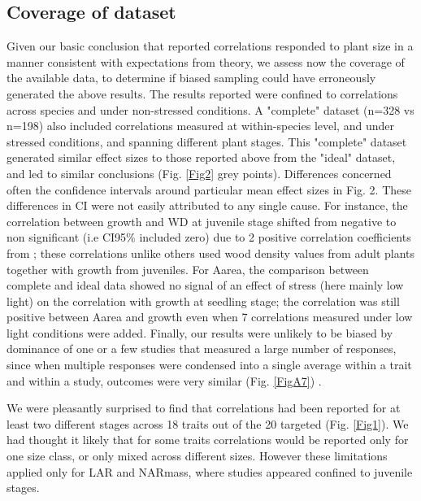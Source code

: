 \documentclass[a4paper]{article}\usepackage[]{graphicx}\usepackage[]{color}
\begin{document}
\subsection*{Coverage of dataset}

Given our basic conclusion that reported correlations responded to plant size in a manner consistent with expectations from theory, we assess now the coverage of the available data, to determine if biased sampling could have erroneously generated the above results. The results reported were confined to correlations across species and under non-stressed conditions. A "complete" dataset (n=328 vs n=198) also included correlations measured at within-species level, and under stressed conditions, and spanning different plant stages. This "complete" dataset generated similar effect sizes to those reported above from the "ideal" dataset, and led to similar conclusions (Fig. \ref{Fig2} grey points). Differences concerned often the confidence intervals around particular mean effect sizes in Fig. 2. These differences in CI were not easily attributed to any single cause. For instance, the correlation between growth and WD at juvenile stage shifted from negative to non significant (i.e CI95\% included zero) due to 2 positive correlation coefficients from \citet{Augspurger:1984ct};  these correlations unlike others used wood density values from adult plants together with growth from juveniles. For Aarea, the comparison between complete and ideal data showed no signal of an effect of stress (here mainly low light) on the correlation with growth at seedling stage; the correlation was still positive between Aarea and growth even when 7 correlations measured under low light conditions were added. Finally, our results were unlikely to be biased by dominance of one or a few studies that measured a large number of responses, since when multiple responses were condensed into a single average within a trait and within a study, outcomes were very similar (Fig. \ref{FigA7}) . 


We were pleasantly surprised to find that correlations had been reported for at least two different stages across 18 traits out of the 20 targeted (Fig. \ref{Fig1}). We had thought it likely that for some traits correlations would be reported only for one size class, or only mixed across different sizes. However these limitations applied only for LAR and NARmass, where studies appeared confined to juvenile stages.  
\end{document}

